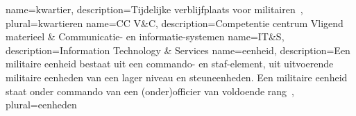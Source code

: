 {
    name=kwartier,
    description={Tijdelijke verblijfplaats voor militairen~\autocite{Wikipedia2021}},
    plural=kwartieren
}
{
    name={CC V\&C},
    description={Competentie centrum Vligend materieel \& Communicatie- en informatie-systemen}
}
{
    name=IT\&S,
    description={Information Technology \& Services}
}
{
    name=eenheid,
    description={Een militaire eenheid bestaat uit een commando- en staf-element, uit uitvoerende militaire eenheden van een lager niveau en steuneenheden. Een militaire eenheid staat onder commando van een (onder)officier van voldoende rang~\autocite{Wikipedia2021a}},
    plural=eenheden
}